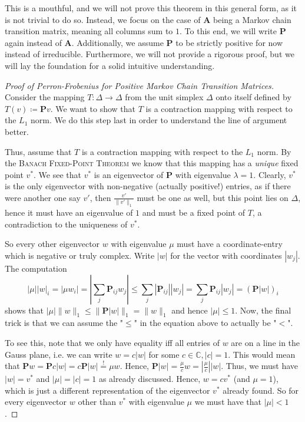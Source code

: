 \documentclass[../../main.tex]{subfiles}
\begin{document}
This is a mouthful, and we will not prove this theorem in this general form, as it is not trivial to do so. Instead, we focus on the case of $\bm{A}$ being a Markov chain transition matrix, meaning all columns sum to $1$. To this end, we will write $\bm{P}$ again instead of $\bm{A}$. Additionally, we assume $\bm{P}$ to be strictly positive for now instead of irreducible. Furthermore, we will not provide a rigorous proof, but we will lay the foundation for a solid intuitive understanding.

\begin{proof}[Proof of Perron-Frobenius for Positive Markov Chain Transition Matrices]
    ~\\
    Consider the mapping $T: \Delta \to \Delta$ from the unit simplex $\Delta$ onto itself defined by $T(v) \coloneqq \bm{P} v$. We want to show that $T$ is a contraction mapping with respect to the $L_1$ norm. We do this step last in order to understand the line of argument better.
    
    Thus, assume that $T$ is a contraction mapping with respect to the $L_1$ norm. By the \textsc{Banach Fixed-Point Theorem} we know that this mapping has a \emph{unique} fixed point $v^*$. We see that $v^*$ is an eigenvector of $\bm{P}$ with eigenvalue $\lambda = 1$. Clearly, $v^*$ is the only eigenvector with non-negative (actually positive!) entries, as if there were another one say $v'$, then $\frac{v'}{\|v'\|_1}$ must be one as well, but this point lies on $\Delta$, hence it must have an eigenvalue of $1$ and must be a fixed point of $T$, a contradiction to the uniqueness of $v^*$.

    So every other eigenvector $w$ with eigenvalue $\mu$ must have a coordinate-entry which is negative or truly complex. Write $|w|$ for the vector with coordinates $|w_j|$. The computation
    \[
        |\mu||w|_i = |\mu w_i| = |\sum_{j} \bm{P}_{ij} w_j| \leq \sum_{j} |\bm{P}_{ij}| |w_j| = \sum_{j} \bm{P}_{ij} |w_j| = (\bm{P} |w|)_i
    \]
    shows that $|\mu| \|w\|_1 \leq \|\bm{P} |w|\|_1 = \|w\|_1$ and hence $|\mu| \leq 1$. Now, the final trick is that we can assume the "$\leq$" in the equation above to actually be "$<$".

    To see this, note that we only have equality iff all entries of $w$ are on a line in the Gauss plane, i.e. we can write $w = c |w|$ for some $c \in \mathbb{C}, |c| = 1$. This would mean that $\bm{P} w = \bm{P} c |w| = c \bm{P} |w| \overset{!}{=} \mu w$. Hence, $\bm{P} |w| = \frac{\mu}{c} w = |\frac{\mu}{c}| |w|$. Thus, we must have $|w| = v^*$ and $|\mu| = |c| = 1$ as already discussed. Hence, $w = c v^*$ (and $\mu = 1$), which is just a different representation of the eigenvector $v^*$ already found. So for every eigenvector $w$ other than $v^*$ with eigenvalue $\mu$ we must have that $|\mu| < 1$.
\end{proof}
\end{document}
